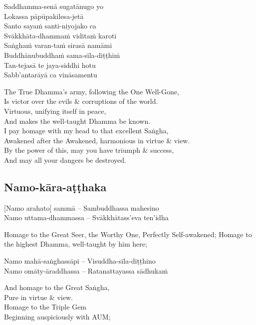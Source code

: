 Saddhamma-senā sugatānugo yo\\
Lokassa pāpūpakilesa-jetā\\
Santo sayaṁ santi-niyojako ca\\
Svākkhāta-dhammaṁ viditaṁ karoti\\
Saṅghaṁ varan-taṁ sirasā namāmi\\
Buddhānubuddhaṁ sama-sīla-diṭṭhiṁ\\
Tan-tejasā te jaya-siddhi hotu\\
Sabb’antarāyā ca vināsamentu

\begin{english}
  The True Dhamma's army, following the One Well-Gone,\\
  Is victor over the evils \& corruptions of the world.\\
  Virtuous, unifying itself in peace,\\
  And makes the well-taught Dhamma be known.\\
  I pay homage with my head to that excellent Saṅgha,\\
  Awakened after the Awakened, harmonious in virtue \& view.\\
  By the power of this, may you have triumph \& success,\\
  And may all your dangers be destroyed.
\end{english}

\suttaRef{[Thai]}

\subsection{Namo-kāra-aṭṭhaka}
\label{namo-kara-atthaka}
[Namo arahato] sammā – Sambuddhassa mahesino\\
Namo uttama-dhammassa – Svākkhātass’eva ten’idha

\begin{english}
  Homage to the Great Seer, the Worthy One, Perfectly Self-awakened; Homage to the highest Dhamma, well-taught by him here;
\end{english}

Namo mahā-saṅghassāpi – Visuddha-sīla-diṭṭhino\\
Namo omāty-āraddhassa – Ratanattayassa sādhukaṁ

\begin{english}
  And homage to the Great Saṅgha,\\
  Pure in virtue \& view.\\
  Homage to the Triple Gem\\
  Beginning auspiciously with AUM;
\end{english}

